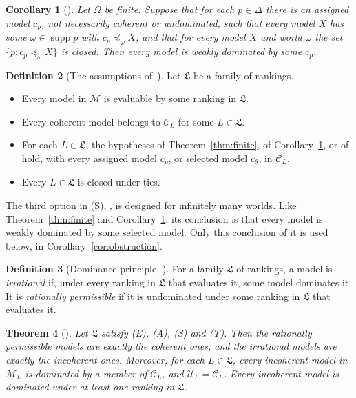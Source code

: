 \documentclass[11pt]{article}
\newtheorem{theorem}{Theorem}[section]
\newtheorem{corollary}[theorem]{Corollary}
\theoremstyle{definition}
\newtheorem{definition}[theorem]{Definition}
\newcommand{\supp}{\operatorname{supp}}
\newcommand{\Cc}{\mathcal C}
\newcommand{\Mc}{\mathcal M}
\newcommand{\Uc}{\mathcal U}
\newcommand{\Lf}{\mathfrak L}
\begin{document}
\begin{corollary}[{\cite[Corollary~2.3]{LDG}}]\label{cor:closed-choice}
Let $\Omega$ be finite. Suppose that for each $p\in\Delta$ there is an assigned model $c_p$, not necessarily coherent or undominated, such that every model $X$ has some $\omega\in\supp p$ with $c_p\preceq_\omega X$, and that for every model $X$ and world $\omega$ the set $\{p:c_p\preceq_\omega X\}$ is closed. Then every model is weakly dominated by some $c_p$.
\end{corollary}

\begin{definition}[{The assumptions of~\cite[Definition~3.3]{LDG}}]\label{def:ESAT}
Let $\Lf$ be a family of rankings.
\begin{itemize}[leftmargin=2.4em]
\item[\textbf{(E)}] Every model in $\Mc$ is evaluable by some ranking in $\Lf$.
\item[\textbf{(A)}] Every coherent model belongs to $\Cc_L$ for some $L\in\Lf$.
\item[\textbf{(S)}] For each $L\in\Lf$, the hypotheses of Theorem~\ref{thm:finite}, of Corollary~\ref{cor:closed-choice}, or of \cite[Theorem~2.4]{LDG} hold, with every assigned model $c_p$, or selected model $c_\theta$, in $\Cc_L$.
\item[\textbf{(T)}] Every $L\in\Lf$ is closed under ties.
\end{itemize}
\end{definition}

The third option in (S), \cite[Theorem~2.4]{LDG}, is designed for infinitely many worlds. Like Theorem~\ref{thm:finite} and Corollary~\ref{cor:closed-choice}, its conclusion is that every model is weakly dominated by some selected model. Only this conclusion of it is used below, in Corollary~\ref{cor:obstruction}.

\begin{definition}[{Dominance principle, \cite[Definition~3.1]{LDG}}]
For a family $\Lf$ of rankings, a model is \emph{irrational} if, under every ranking in $\Lf$ that evaluates it, some model dominates it. It is \emph{rationally permissible} if it is undominated under some ranking in $\Lf$ that evaluates it.
\end{definition}

\begin{theorem}[{\cite[Theorem~3.4]{LDG}}]\label{thm:argument}
Let $\Lf$ satisfy (E), (A), (S) and (T). Then the rationally permissible models are exactly the coherent ones, and the irrational models are exactly the incoherent ones. Moreover, for each $L\in\Lf$, every incoherent model in $\Mc_L$ is dominated by a member of $\Cc_L$, and $\Uc_L=\Cc_L$. Every incoherent model is dominated under at least one ranking in $\Lf$.
\end{theorem}
\end{document}
